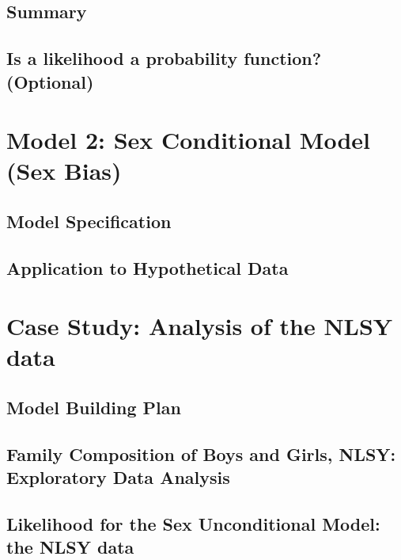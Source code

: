 \documentclass[
]{krantz}
\begin{document}
\hypertarget{summary}{%
\subsection{Summary}\label{summary}}

\hypertarget{is-a-likelihood-a-probability-function-optional}{%
\subsection{Is a likelihood a probability function? (Optional)}\label{is-a-likelihood-a-probability-function-optional}}

\hypertarget{sex_conditional.sec}{%
\section{Model 2: Sex Conditional Model (Sex Bias)}\label{sex_conditional.sec}}

\hypertarget{model-specification}{%
\subsection{Model Specification}\label{model-specification}}

\hypertarget{application-to-hypothetical-data}{%
\subsection{Application to Hypothetical Data}\label{application-to-hypothetical-data}}

\hypertarget{case-study-analysis-of-the-nlsy-data}{%
\section{Case Study: Analysis of the NLSY data}\label{case-study-analysis-of-the-nlsy-data}}

\hypertarget{model-building-plan}{%
\subsection{Model Building Plan}\label{model-building-plan}}

\hypertarget{EDA.sec}{%
\subsection{Family Composition of Boys and Girls, NLSY: Exploratory Data Analysis}\label{EDA.sec}}

\hypertarget{likelihood-for-the-sex-unconditional-model-the-nlsy-data}{%
\subsection{Likelihood for the Sex Unconditional Model: the NLSY data}\label{likelihood-for-the-sex-unconditional-model-the-nlsy-data}}
\end{document}

